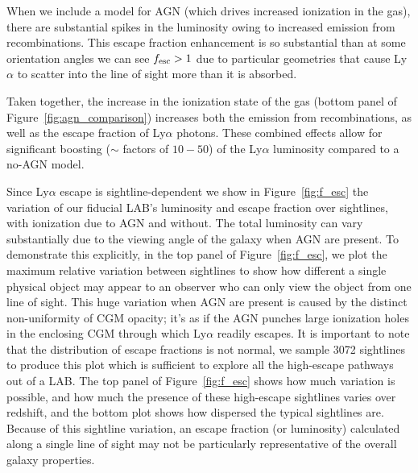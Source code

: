 When we include a model for AGN (which drives increased ionization in the gas), there are substantial spikes in the luminosity owing to increased emission from recombinations.
This escape fraction enhancement is so substantial than at some orientation angles we can see $f_{\rm esc} > 1$ due to particular geometries that cause Ly$\alpha$ to scatter into the line of sight more than it is absorbed.

Taken together, the increase in the ionization state of the gas (bottom panel of Figure~\ref{fig:agn_comparison}) increases both the emission from recombinations, as well as the escape fraction of Ly$\alpha$ photons.
These combined effects allow for significant boosting ($\sim$ factors of $10-50$) of the Ly$\alpha$ luminosity compared to a no-AGN model.



Since Ly$\alpha$ escape is sightline-dependent we show in Figure~\ref{fig:f_esc} the variation of our fiducial LAB's luminosity and escape fraction over sightlines, with ionization due to AGN and without.
The total luminosity can vary substantially due to the viewing angle of the galaxy when AGN are present.
To demonstrate this explicitly, in the top panel of Figure~\ref{fig:f_esc}, we plot the maximum relative variation between sightlines to show how different a single physical object may appear to an observer who can only view the object from one line of sight.
This huge variation when AGN are present is caused by the distinct non-uniformity of CGM opacity; it's as if the AGN punches large ionization holes in the enclosing CGM through which Ly$\alpha$ readily escapes.
It is important to note that the distribution of escape fractions is not normal, we sample 3072 sightlines to produce this plot which is sufficient to explore all the high-escape pathways out of a LAB.
The top panel of Figure~\ref{fig:f_esc} shows how much variation is possible, and how much the presence of these high-escape sightlines varies over redshift, and the bottom plot shows how dispersed the typical sightlines are.
Because of this sightline variation, an escape fraction (or luminosity) calculated along a single line of sight may not be particularly representative of the overall galaxy properties.

